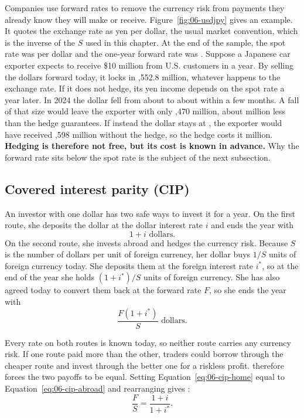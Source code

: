 Companies use forward rates to remove the currency risk from payments they already know they will make or receive. Figure~\ref{fig:06-usdjpy} gives an example. It quotes the exchange rate as yen per dollar, the usual market convention, which is the inverse of the $S$ used in this chapter. At the end of the sample, the spot rate was  per dollar and the one-year forward rate was . Suppose a Japanese car exporter expects to receive \$10 million from U.S. customers in a year. By selling the dollars forward today, it locks in ,552.8 million, whatever happens to the exchange rate. If it does not hedge, its yen income depends on the spot rate a year later. In 2024 the dollar fell from about  to about  within a few months. A fall of that size would leave the exporter with only ,470 million, about  million less than the hedge guarantees. If instead the dollar stays at , the exporter would have received ,598 million without the hedge, so the hedge costs it  million. \textbf{Hedging is therefore not free, but its cost is known in advance.} Why the forward rate sits below the spot rate is the subject of the next subsection.


\subsection{Covered interest parity (CIP)}

An investor with one dollar has two safe ways to invest it for a year. On the first route, she deposits the dollar at the dollar interest rate $i$ and ends the year with
\begin{equation}
  1 + i \text{ dollars.}
  \label{eq:06-cip-home}
\end{equation}
On the second route, she invests abroad and hedges the currency risk. Because $S$ is the number of dollars per unit of foreign currency, her dollar buys $1/S$ units of foreign currency today. She deposits them at the foreign interest rate $i^*$, so at the end of the year she holds $(1+i^*)/S$ units of foreign currency. She has also agreed today to convert them back at the forward rate $F$, so she ends the year with
\begin{equation}
  \frac{F(1+i^*)}{S} \text{ dollars.}
  \label{eq:06-cip-abroad}
\end{equation}

Every rate on both routes is known today, so neither route carries any currency risk. If one route paid more than the other, traders could borrow through the cheaper route and invest through the better one for a riskless profit.  therefore forces the two payoffs to be equal. Setting Equation~\eqref{eq:06-cip-home} equal to Equation~\eqref{eq:06-cip-abroad} and rearranging gives :
\begin{equation}
  \frac{F}{S} = \frac{1 + i}{1 + i^*}.
  \label{eq:06-cip}
\end{equation}

